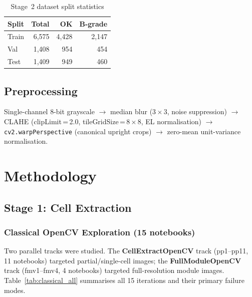 \documentclass[conference]{IEEEtran}
\begin{document}
\begin{table}[t]
  \caption{Stage~2 dataset split statistics}
  \label{tab:datasplit}
  \begin{center}
  \renewcommand{\arraystretch}{1.05}\small
  \begin{tabular}{lrrr}
    \toprule
    \textbf{Split} & \textbf{Total} & \textbf{OK} & \textbf{B-grade}\\
    \midrule
    Train & 6{,}575 & 4{,}428 & 2{,}147\\
    Val   & 1{,}408 &   954   &   454\\
    Test  & 1{,}409 &   949   &   460\\
    \bottomrule
  \end{tabular}
  \end{center}
\end{table}

\subsection{Preprocessing}
Single-channel 8-bit grayscale $\to$ median blur ($3\times3$, noise suppression) $\to$ CLAHE (clipLimit\,=\,2.0, tileGridSize\,=\,$8\times8$, EL normalisation) $\to$ \texttt{cv2.warpPerspective} (canonical upright crops) $\to$ zero-mean unit-variance normalisation.

\section{Methodology}
\label{sec:method}

\subsection{Stage 1: Cell Extraction}
\label{sec:stage1}

\subsubsection{Classical OpenCV Exploration (15 notebooks)}

Two parallel tracks were studied. The \textbf{CellExtractOpenCV} track (pp1--pp11, 11 notebooks) targeted partial/single-cell images; the \textbf{FullModuleOpenCV} track (fmv1--fmv4, 4 notebooks) targeted full-resolution module images. Table~\ref{tab:classical_all} summarises all 15 iterations and their primary failure modes.
\end{document}
